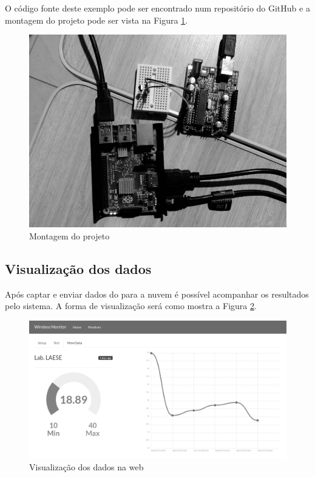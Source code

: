 O código fonte deste exemplo pode ser encontrado num repositório do
GitHub \cite{alves:2016} e a montagem do projeto pode ser vista na
Figura \ref{fig:montagem}.

\begin{figure}[h]
    \centering
    \includegraphics[scale=0.35]{img/montagem-grey.jpg}
    \caption{Montagem do projeto} \label{fig:montagem}
\end{figure}

\subsection{Visualização dos dados}\label{visualizauxe7uxe3o-dos-dados}

Após captar e enviar dados do \iot para a nuvem é possível acompanhar os
resultados pelo sistema. A forma de visualização será como mostra a
Figura \ref{fig:view-monitor}.

\begin{figure}[h]
    \centering
    \includegraphics[scale=0.3]{img/temperature-show-grey.png}
    \caption{Visualização dos dados na web} \label{fig:view-monitor}
\end{figure}

